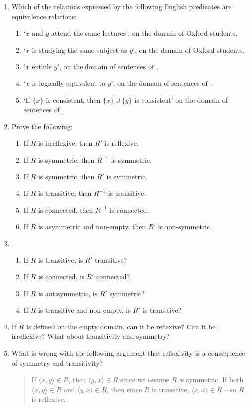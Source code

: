{\begin{enumerate}
	
\item Which of the relations expressed by the following English predicates are equivalence relations: \begin{enumerate}
	\item `$x$ and $y$ attend the same lectures', on the domain of Oxford students.
	\item `$x$ is studying the same subject as $y$', on the domain of Oxford students.
	\item `$x$ entails $y$', on the domain of sentences of \ltwo.
	\item `$x$ is logically equivalent to $y$', on the domain of sentences of \ltwo.
	\item `If $\{x\}$ is consistent, then $\{x\}\cup \{y\}$ is consistent' on the domain of sentences of \ltwo.
\end{enumerate}
\item Prove the following: \begin{enumerate}
\item If $R$ is irreflexive, then $R'$ is reflexive.
	\item If $R$ is symmetric, then $R^{-1}$ is symmetric.
	\item If $R$ is symmetric, then $R'$ is symmetric.
	\item If $R$ is transitive, then $R^{-1}$ is transitive.
	\item If $R$ is connected, then $R^{-1}$ is connected.
	\item If $R$ is asymmetric and non-empty, then $R'$ is non-symmetric.
\end{enumerate}
\item \begin{enumerate}
	\item If $R$ is transitive, is $R'$ transitive?
	\item If $R$ is connected, is $R'$ connected?
	\item If $R$ is antisymmetric, is $R'$ symmetric?
	\item If $R$ is transitive and non-empty, is $R'$ is transitive?
\end{enumerate}
\item If $R$ is defined on the empty domain, 
    can it be reflexive? Can it be irreflexive? What about
    transitivity and symmetry?
\item What is wrong with the following argument that reflexivity is a consequence of symmetry and transitivity? \begin{quote}
	If $\langle x,y\rangle \in R$, then $\langle y,x\rangle\in R$ since we assume $R$ is symmetric. If both $\langle x,y\rangle\in R$ and $\langle y,x\rangle \in R$, then since $R$ is transitive, $\langle x,x\rangle\in R$ – so $R$ is reflexive.

\end{quote}
\end{enumerate}}
